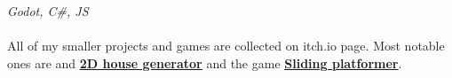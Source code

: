 \documentclass{article}
\begin{document}
\noindent\textit{Godot, C\#, JS}
\\\\
\noindent All of my smaller projects and games are collected on itch.io page. Most notable ones are
and \href{https://llesha.itch.io/2d-house-generator}{{\textbf{\underline{2D house generator}}}} and the game \href{https://llesha.itch.io/sliding-platformer}{{\textbf{\underline{Sliding platformer}}}}.
\end{document}
